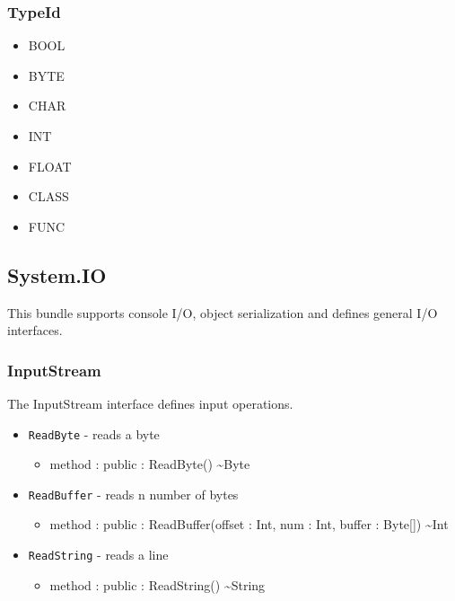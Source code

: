 \documentclass[11pt]{article}
\begin{document}
\subsubsection{TypeId}
\begin{itemize}
\item BOOL
\item BYTE
\item CHAR
\item INT
\item FLOAT
\item CLASS
\item FUNC
\end{itemize}

\subsection{System.IO}
This bundle supports console I/O, object serialization and defines
general I/O interfaces.

\subsubsection{InputStream}
The InputStream interface defines input operations.
\begin{itemize}
\item \texttt{ReadByte} - reads a byte
  \begin{itemize}
  \item method : public : ReadByte() \textasciitilde Byte
  \end{itemize}
\item \texttt{ReadBuffer} - reads n number of bytes
  \begin{itemize}
  \item method : public : ReadBuffer(offset : Int, num : Int, buffer :
    Byte[]) \textasciitilde Int
  \end{itemize}
\item \texttt{ReadString} - reads a line
  \begin{itemize}
  \item method : public : ReadString() \textasciitilde String
  \end{itemize}
\end{itemize}
\end{document}
